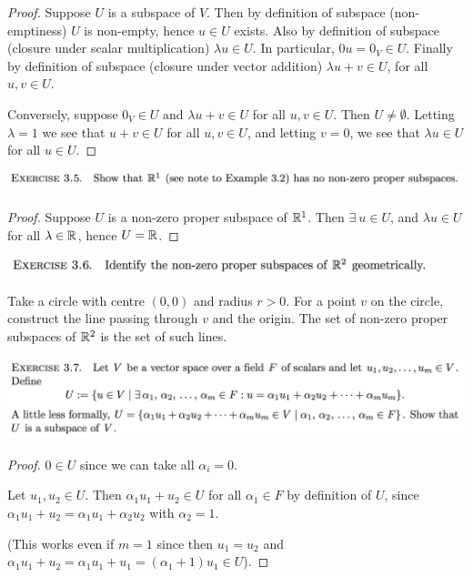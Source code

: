 \documentclass[12pt]{article}
\begin{document}
\begin{proof}
  Suppose $U$ is a subspace of $V$. Then by definition of subspace
  (non-emptiness) $U$ is non-empty, hence $u \in U$ exists. Also by definition
  of subspace (closure under scalar multiplication) $\lambda u \in U$. In
  particular, $0u = 0_V \in U$. Finally by definition of subspace (closure
  under vector addition) $\lambda u + v \in U$, for all $u, v \in U$.

  Conversely, suppose $0_V \in U$ and $\lambda u + v \in U$ for all
  $u, v \in U$. Then $U \neq \emptyset$. Letting $\lambda = 1$ we see that
  $u + v \in U$ for all $u, v \in U$, and letting $v = 0$, we see that
  $\lambda u \in U$ for all $u \in U$.
\end{proof}

\begin{mdframed}
\includegraphics[width=400pt]{img/oxford-prelims-M1-linear-algebra-3-5.png}
\end{mdframed}

\begin{proof}
  Suppose $U$ is a non-zero proper subspace of $\mathbb{R}^1$. Then
  $\exists ~ u \in U$, and $\lambda u \in U$ for all $\lambda \in \mathbb{R}$, hence
  $U = \mathbb{R}$.
\end{proof}

\begin{mdframed}
\includegraphics[width=350pt]{img/oxford-prelims-M1-linear-algebra-3-6.png}
\end{mdframed}
Take a circle with centre $(0, 0)$ and radius $r > 0$. For a point $v$ on the
circle, construct the line passing through $v$ and the origin. The set of
non-zero proper subspaces of $\mathbb{R}^2$ is the set of such lines.

\begin{mdframed}
\includegraphics[width=400pt]{img/oxford-prelims-M1-linear-algebra-3-7.png}
\end{mdframed}

\begin{proof}
  $0 \in U$ since we can take all $\alpha_i = 0$.

  Let $u_1, u_2 \in U$. Then $\alpha_1u_1 + u_2 \in U$ for all $\alpha_1 \in F$
  by definition of $U$, since $\alpha_1u_1 + u_2 = \alpha_1 u_1 + \alpha_2 u_2$
  with $\alpha_2 = 1$.

  (This works even if $m = 1$ since then $u_1 = u_2$ and
  $\alpha_1u_1 + u_2 = \alpha_1 u_1 + u_1 = (\alpha_1 + 1)u_1 \in U$).
\end{proof}
\end{document}
